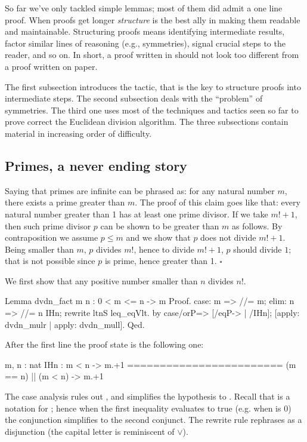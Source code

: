 So far we've only tackled simple lemmas; most of them did admit a one line
proof.  When proofs get longer \emph{structure} is the best ally in making
them readable and maintainable.  Structuring proofs means identifying
intermediate results, factor similar lines of reasoning (e.g., symmetries),
signal crucial steps to the reader, and so on.  In short, a
proof written in \Coq{} should not look too different from a proof
written on paper.

The first subsection introduces the  tactic, that is the key
to structure proofs into intermediate steps.  The second subsection
deals with the ``problem'' of symmetries.  The third one uses most
of the techniques and tactics seen so far to prove correct the
Euclidean division algorithm.  The three subsections contain
material in increasing order of difficulty.

\subsection{Primes, a never ending story}\label{sec:infprimes}

Saying that primes are infinite can be phrased as: for any natural number
$m$, there exists a prime greater than $m$.  The proof of this claim goes like
that: every natural number greater than 1 has at least one prime divisor.  If
we take $m! + 1$, then such prime divisor $p$ can be shown to be greater than $m$ as
follows.  By contraposition we assume $p \leq m$ and we show that $p$
does not divide $m!+1$.
Being smaller than $m$, $p$ divides $m!$, hence to divide $m!+1$, $p$ should divide
$1$; that is not possible since $p$ is prime, hence greater than 1.
\hfill$\square$

We first show that any positive number smaller than $n$ divides $n!$.

\begin{coq}{}{}
Lemma dvdn_fact m n : 0 < m <= n -> m %
Proof.
case: m => //= m; elim: n => //= n IHn; rewrite ltnS leq_eqVlt.
by case/orP=> [/eqP-> | /IHn]; [apply: dvdn_mulr | apply: dvdn_mull].
Qed.
\end{coq}

After the first line the proof state is the following one:

\begin{coqout}{}{}
m, n : nat
IHn : m < n -> m.+1 %
========================
(m == n) || (m < n) -> m.+1 %
\end{coqout}
The case analysis rules out , and simplifies the hypothesis
to .  Recall that  is a notation for ; hence when the first inequality evaluates to true (e.g. when 
is 0) the conjunction simplifies to the second conjunct.  The 
rewrite rule rephrases \C{<=} as a disjunction (the capital  letter
is reminiscent of $\lor$).

